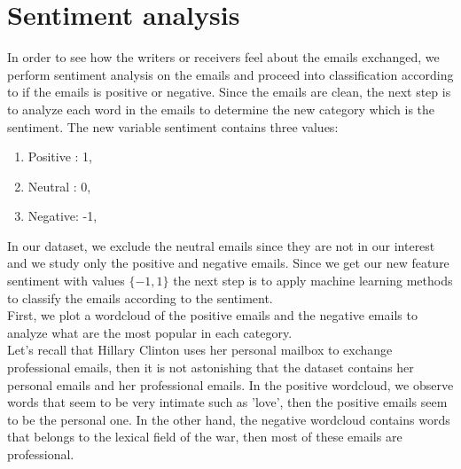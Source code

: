\documentclass[11pt]{article}
\begin{document}
\section{Sentiment analysis}
In order to see how the writers or receivers feel about the emails exchanged, we perform sentiment analysis on the emails and proceed into classification according to if the emails is positive or negative. Since the emails are clean, the next step is to analyze each word in the emails to determine the new category which is the sentiment. The new variable sentiment contains three values:
\begin{enumerate}
    \item Positive : 1,
    \item Neutral : 0,
    \item Negative: -1,
\end{enumerate}
In our dataset, we exclude the neutral emails since they are not in our interest and we study only the positive and negative emails. Since we get our new feature sentiment with values $\{-1,1\}$ the next step is to apply machine learning methods to classify the emails according to the sentiment.\\

First, we plot a wordcloud of the positive emails and the negative emails to analyze what are the most popular in each category.\\

Let's recall that Hillary Clinton uses her personal mailbox to exchange professional emails, then it is not astonishing that the dataset contains her personal emails and her professional emails. In the positive wordcloud, we observe words that seem to be very intimate such as 'love', then the positive emails seem to be the personal one. In the other hand, the negative wordcloud contains words that belongs to the lexical field of the war, then most of these emails are professional.\\
\end{document}

